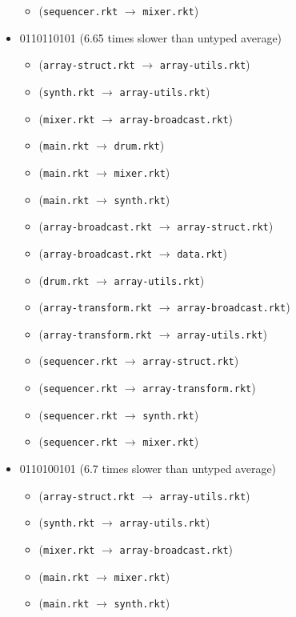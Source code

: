 \documentclass{article}
\newcommand{\mono}[1]{\texttt{#1}}
\begin{document}
\begin{itemize}
\begin{itemize}
  \item (\mono{sequencer.rkt} $\rightarrow$ \mono{mixer.rkt})
  \end{itemize}
\item 0110110101 (6.65 times slower than untyped average)
  \begin{itemize}
  \item (\mono{array-struct.rkt} $\rightarrow$ \mono{array-utils.rkt})
  \item (\mono{synth.rkt} $\rightarrow$ \mono{array-utils.rkt})
  \item (\mono{mixer.rkt} $\rightarrow$ \mono{array-broadcast.rkt})
  \item (\mono{main.rkt} $\rightarrow$ \mono{drum.rkt})
  \item (\mono{main.rkt} $\rightarrow$ \mono{mixer.rkt})
  \item (\mono{main.rkt} $\rightarrow$ \mono{synth.rkt})
  \item (\mono{array-broadcast.rkt} $\rightarrow$ \mono{array-struct.rkt})
  \item (\mono{array-broadcast.rkt} $\rightarrow$ \mono{data.rkt})
  \item (\mono{drum.rkt} $\rightarrow$ \mono{array-utils.rkt})
  \item (\mono{array-transform.rkt} $\rightarrow$ \mono{array-broadcast.rkt})
  \item (\mono{array-transform.rkt} $\rightarrow$ \mono{array-utils.rkt})
  \item (\mono{sequencer.rkt} $\rightarrow$ \mono{array-struct.rkt})
  \item (\mono{sequencer.rkt} $\rightarrow$ \mono{array-transform.rkt})
  \item (\mono{sequencer.rkt} $\rightarrow$ \mono{synth.rkt})
  \item (\mono{sequencer.rkt} $\rightarrow$ \mono{mixer.rkt})
  \end{itemize}
\item 0110100101 (6.7 times slower than untyped average)
  \begin{itemize}
  \item (\mono{array-struct.rkt} $\rightarrow$ \mono{array-utils.rkt})
  \item (\mono{synth.rkt} $\rightarrow$ \mono{array-utils.rkt})
  \item (\mono{mixer.rkt} $\rightarrow$ \mono{array-broadcast.rkt})
  \item (\mono{main.rkt} $\rightarrow$ \mono{mixer.rkt})
  \item (\mono{main.rkt} $\rightarrow$ \mono{synth.rkt})

\end{itemize}
\end{itemize}
\end{document}

